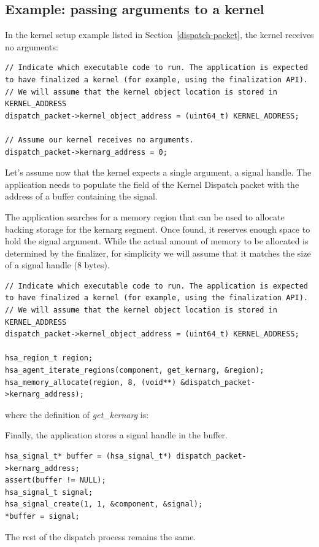 \documentclass[final,oneside]{book}
\begin{document}
\subsection{Example: passing arguments to a kernel}\label{ex:kernarg_dispatch}
In the kernel setup example listed in Section~\ref{dispatch-packet}, the kernel
receives no arguments:
\begin{lstlisting}
// Indicate which executable code to run. The application is expected to have finalized a kernel (for example, using the finalization API).
// We will assume that the kernel object location is stored in KERNEL_ADDRESS
dispatch_packet->kernel_object_address = (uint64_t) KERNEL_ADDRESS;

// Assume our kernel receives no arguments.
dispatch_packet->kernarg_address = 0;
\end{lstlisting}
Let's assume now that the kernel expects a single argument, a signal handle. The
application needs to populate the
 field of the Kernel
Dispatch packet with the address of a buffer containing the signal.

The application searches for a memory region that can be used to allocate
backing storage for the kernarg segment. Once found, it reserves enough space to
hold the signal argument. While the actual amount of memory to be allocated is
determined by the finalizer, for simplicity we will assume that it matches the
size of a signal handle (8 bytes).
\begin{lstlisting}
// Indicate which executable code to run. The application is expected to have finalized a kernel (for example, using the finalization API).
// We will assume that the kernel object location is stored in KERNEL_ADDRESS
dispatch_packet->kernel_object_address = (uint64_t) KERNEL_ADDRESS;

hsa_region_t region;
hsa_agent_iterate_regions(component, get_kernarg, &region);
hsa_memory_allocate(region, 8, (void**) &dispatch_packet->kernarg_address);
\end{lstlisting}
where the definition of \textit{get_kernarg} is:


Finally, the application stores a signal handle in the buffer.
\begin{lstlisting}
hsa_signal_t* buffer = (hsa_signal_t*) dispatch_packet->kernarg_address;
assert(buffer != NULL);
hsa_signal_t signal;
hsa_signal_create(1, 1, &component, &signal);
*buffer = signal;
\end{lstlisting}
The rest of the dispatch process remains the same.
\end{document}
